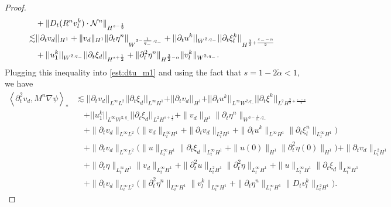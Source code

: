 \documentclass[letterpaper,reqno,10pt,twoside]{amsart}
\theoremstyle{definition}
\theoremstyle{remark}
\def\p{\partial}
\begin{document}
\begin{proof}
\begin{align}
			&+\|D_{t}(R^{n}v_{l}^{k})\cdot \mathcal{N}^{n}\|_{H^{s-\frac{1}{2}}}\notag\\
			\lesssim &\vert \vert \p_{t}v_{d}\vert \vert_{H^{1}}+\|v_{d}\|_{H^{1}}\|\p_{t}\eta^{n}\|_{W^{3-\frac{1}{q_{-}},q_{-}}}+\vert \vert \partial_{t}u^{k}\vert \vert_{W^{2,q_{-}}}\vert \vert \partial_{t}\xi_{l} ^{k}\vert \vert_{H^{\frac{3}{2}+\frac{\varepsilon_{-}-\alpha}{2}}}\notag\\
			&+\vert \vert u_{1}^{k}\vert \vert_{W^{2,q_{-}}}\vert \vert \partial_{t}\xi_{d}\vert \vert_{H^{s+\frac{1}{2}}}+\|\p_{t}^{2}\eta^{n}\|_{H^{\frac{3}{2}-\alpha}}\|v_{l}^{k}\|_{W^{2,q_{-}}}.
		\end{align}
		Plugging this inequality into \eqref{est:dtu_m1} and using the fact that $s=1-2\tilde\alpha<1$, we have
		\begin{equation}
			\begin{aligned}
				\left<\partial_{t}^{2}v_{d},M^{n}\nabla \psi\right>_{*}&\lesssim \vert \vert \partial_{t}v_{d}\vert \vert_{L^{\infty}L^{2}}\vert \vert \partial_{t}\xi_{d}\vert \vert_{L^{\infty}H^{1}}+\vert \vert \p_{t}v_{d}\vert \vert_{H^{1}}+\vert \vert \partial_{t}u^{k}\vert \vert_{L^{\infty}W^{2,q_{-}}}\vert \vert \partial_{t}\xi^{k} \vert \vert_{L^{2}H^{\frac{3}{2}+\frac{\varepsilon_{-}-\alpha}{2}}}\\
				&\quad+\vert \vert u_{1}^{k}\vert \vert_{L^{\infty}W^{2,q_{-}}}\vert \vert \partial_{t}\xi_{d}\vert \vert_{L^{2}H^{s+\frac{1}{2}}}+\|v_{d}\|_{H^{1}}\|\p_{t}\eta^{n}\|_{W^{3-\frac{1}{q_{-}},q_{-}}}\\
				&\quad+\|\p_{t}v_{d}\|_{L^{\infty}L^{2}}\Big(\|v_{d}\|_{L_{t}^{\infty}H^{1}}+\|\p_{t}v_{d}\|_{L_{t}^{2}H^{1}}+\|\p_{t}u^{k}\|_{L^{\infty}H^{1}}\|\p_{t}\xi_{l}^{n}\|_{L_{t}^{\infty}H^{1}}\Big)\\
				&\quad+\|\p_{t}v_{d}\|_{L^{\infty}L^{2}}\Big(\|u\|_{L_{t}^{\infty}H^{1}}\|\p_{t}\xi_{d}\|_{L_{t}^{\infty}H^{1}}+\|u(0)\|_{H^{1}}\|\p_{t}^{2}\eta(0)\|_{H^{1}}\Big)+\|\p_{t}v_{d}\|_{L_{t}^{2}H^{1}}\\
				&\quad+\|\p_{t}\eta\|_{L_{t}^{\infty}H^{1}}\|v_{d}\|_{L_{t}^{\infty}H^{1}}+\|\p_{t}^{2}u\|_{L_{t}^{2}H^{1}}\|\p_{t}^{2}\eta\|_{L_{t}^{\infty}H^{1}}+\|u\|_{L_{t}^{\infty}H^{1}}\|\p_{t}\xi_{d}\|_{L_{t}^{\infty}H^{1}}\\
				&\quad+\|\p_{t}v_{d}\|_{L_{t}^{\infty}L^{2}}\Big(\|\p_{t}^{2}\eta^{n}\|_{L_{t}^{\infty}H^{1}}\|v_{l}^{k}\|_{L_{t}^{\infty}H^{1}}+\|\p_{t}\eta^{n}\|_{L_{t}^{\infty}H^{1}}\|D_{t}v_{l}^{k}\|_{L_{t}^{2}H^{1}}\Big).
			\end{aligned}
		\end{equation}
		

\end{proof}
\end{document}
